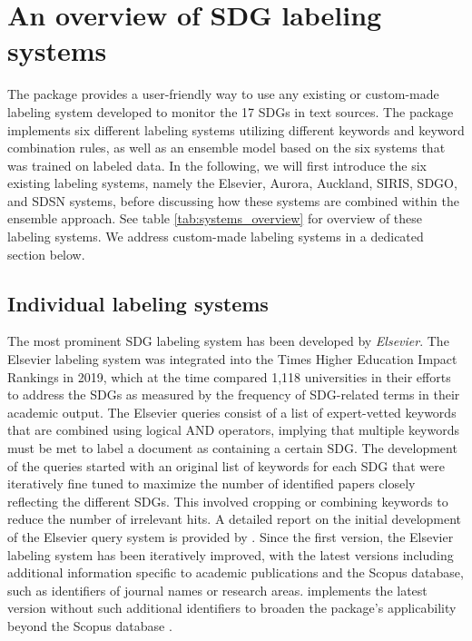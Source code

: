 \section{An overview of SDG labeling systems}

 The  package provides a user-friendly way to use any existing or custom-made labeling system developed to monitor the 17 SDGs in text sources. The package implements six different labeling systems utilizing different keywords and keyword combination rules, as well as an ensemble model based on the six systems that was trained on labeled data. In the following, we will first introduce the six existing labeling systems, namely the Elsevier, Aurora, Auckland, SIRIS, SDGO, and SDSN systems, before discussing how these systems are combined within the ensemble approach. See table \ref{tab:systems_overview} for overview of these labeling systems. We address custom-made labeling systems in a dedicated section below.   

 \subsection{Individual labeling systems}
  
 The most prominent SDG labeling system has been developed by \textit{Elsevier}. The Elsevier labeling system was integrated into the Times Higher Education Impact Rankings in 2019, which at the time compared 1,118 universities in their efforts to address the SDGs as measured by the frequency of SDG-related terms in their academic output. The Elsevier queries consist of a list of expert-vetted keywords that are combined using logical AND operators, implying that multiple keywords must be met to label a document as containing a certain SDG. The development of the queries started with an original list of keywords for each SDG that were iteratively fine tuned to maximize the number of identified papers closely reflecting the different SDGs. This involved cropping or combining keywords to reduce the number of irrelevant hits. A detailed report on the initial development of the Elsevier query system is provided by \citet[]{jayabalasingham2019identifying}. Since the first version, the Elsevier labeling system has been iteratively improved, with the latest versions including additional information specific to academic publications and the Scopus database, such as identifiers of journal names or research areas.  implements the latest version without such additional identifiers to broaden the package's applicability beyond the Scopus database \citep[]{jayabalasingham2019identifying}.
 

